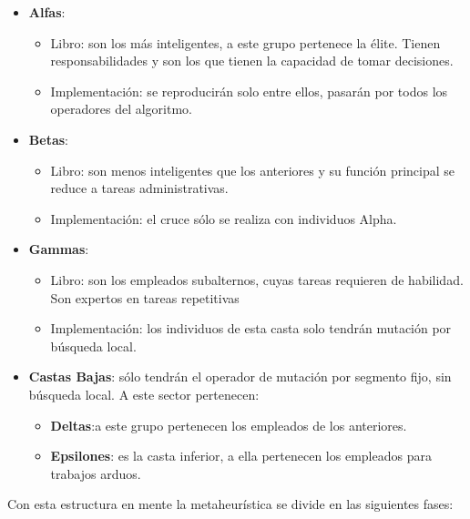 \begin{itemize}
    \item \textbf{Alfas}:
        \begin{itemize}
            \item Libro: son los más inteligentes, a este grupo pertenece la élite. Tienen responsabilidades y son
            los que tienen la capacidad de tomar decisiones.
            \item Implementación: se reproducirán solo entre ellos, pasarán por todos los operadores del algoritmo.
        \end{itemize}
    \item \textbf{Betas}: 
        \begin{itemize}
            \item Libro: son menos inteligentes que los anteriores y su función principal se reduce a tareas
            administrativas.
            \item  Implementación: el cruce sólo se realiza con individuos Alpha.
        \end{itemize}
    \item \textbf{Gammas}: 
        \begin{itemize}
            \item Libro: son los empleados subalternos, cuyas tareas requieren de habilidad. Son expertos en tareas repetitivas
            \item Implementación: los individuos de esta casta solo tendrán mutación por búsqueda local.
        \end{itemize}
    \item \textbf{Castas Bajas}: sólo tendrán el operador de mutación por segmento fijo, sin búsqueda local. A este sector pertenecen:
        \begin{itemize}
            \item \textbf{Deltas}:a este grupo pertenecen los empleados de los anteriores.
            \item \textbf{Epsilones}: es la casta inferior, a ella pertenecen los empleados para trabajos arduos.
        \end{itemize}
\end{itemize}

Con esta estructura en mente la metaheurística se divide en las siguientes fases:

